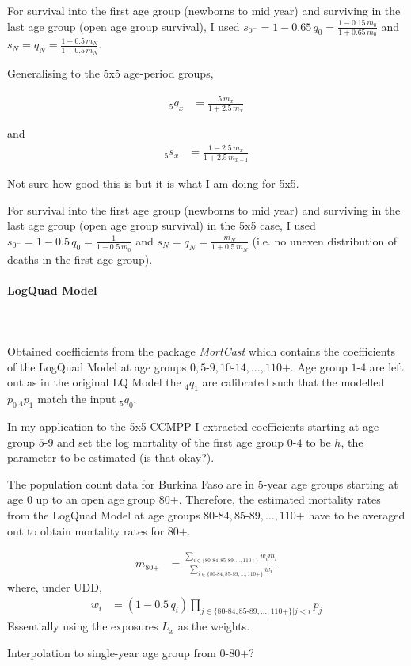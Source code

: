 \documentclass[12pt,a4paper]{article}
\begin{document}
For survival into the first age group (newborns to mid year) and surviving in the last age group (open age group survival), I used $s_{0^{-}} = 1 - 0.65 \, q_0 = \frac{1 - 0.15 \, m_0}{1+ 0.65 \, m_0}$ and $s_N = q_N = \frac{1 - 0.5 \, m_N}{1+0.5 \, m_N}$.

\newpage
Generalising to the 5x5 age-period groups,

\begin{align*}
_5q_x &= \frac{5 \, m_x}{1+ 2.5 \, m_x}
\end{align*}

and
\begin{align*}
 _5s_x &=  \frac{1 - 2.5 \, m_x}{1 + 2.5 \, m_{x+1}}
\end{align*}

Not sure how good this is but it is what I am doing for 5x5.

For survival into the first age group (newborns to mid year) and surviving in the last age group (open age group survival) in the 5x5 case, I used $s_{0^{-}} = 1 - 0.5 \, q_0 = \frac{1}{1+ 0.5 \, m_0}$ and $s_N = q_N = \frac{m_N}{1+0.5 \, m_N}$ (i.e. no uneven distribution of deaths in the first age group).
 
\paragraph{LogQuad Model} \\~\\
Obtained coefficients from the package \textit{MortCast} which contains the coefficients of the LogQuad Model at age groups $0, 5\text{-}9, 10\text{-}14, \dots, 110\text{+}$. Age group $1\text{-}4$ are left out as in the original LQ Model the $_4q_1$ are calibrated such that the modelled $p_0 \, _4p_1$ match the input $_5q_0$. 

In my application to the 5x5 CCMPP I extracted coefficients starting at age group $5\text{-}9$ and set the log mortality of the first age group $0\text{-}4$ to be $h$, the parameter to be estimated (is that okay?).

The population count data for Burkina Faso are in 5-year age groups starting at age 0 up to an open age group $80\text{+}$. Therefore, the estimated mortality rates from the LogQuad Model at age groups $80\text{-}84, 85\text{-}89, \dots, 110\text{+}$ have to be averaged out to obtain mortality rates for $80\text{+}$.

\begin{align*}
m_{80\text{+}} &= \frac{\sum_{i \in \{80\text{-}84, 85\text{-}89, \dots, 110\text{+} \}} w_i m_i }{\sum_{i \in \{80\text{-}84, 85\text{-}89, \dots, 110\text{+} \}} w_i}
\end{align*}
where, under UDD,
\begin{align*}
w_i &= (1-0.5 \, q_i) \prod_{j \in \{80\text{-}84, 85\text{-}89, \dots, 110\text{+} \} \vert j < i} p_j
\end{align*}
Essentially using the exposures $L_x$ as the weights.

Interpolation to single-year age group from $0\text{-}80\text{+}$?
\end{document}
